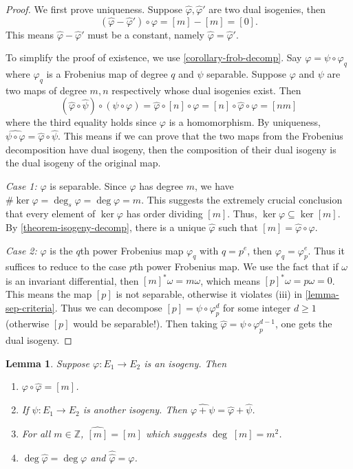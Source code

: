 \documentclass[12pt]{article}
\newtheorem{lemma}{Lemma}[subsection]
\theoremstyle{remark}
\theoremstyle{definition}
\newcommand{\w}[0]{\omega}
\newcommand{\Z}[0]{\mathbb{Z}}
\begin{document}
        \begin{proof}
            We first prove uniqueness. Suppose $\hat\varphi,\hat\varphi'$ are two dual isogenies, then \[\left(\hat\varphi-\hat\varphi'\right)\circ\varphi=[m]-[m]=[0].\] 
            This means $\hat\varphi-\hat\varphi'$ must be a constant, namely $\hat\varphi=\hat\varphi'$.
    
            To simplify the proof of existence, we use \autoref{corollary-frob-decomp}. Say $\varphi=\psi\circ\varphi_q$ where $\varphi_q$ is a Frobenius map of degree $q$ and $\psi$ separable. Suppose $\varphi$ and $\psi$ are two maps of degree $m,n$ respectively whose dual isogenies exist. Then 
            \[(\hat{\varphi}\circ\hat\psi)\circ(\psi\circ\varphi)=\hat\varphi\circ[n]\circ\varphi=[n]\circ\hat\varphi\circ\varphi=[nm]\]
            where the third equality holds since $\varphi$ is a homomorphism. By uniqueness, $\widehat{\psi\circ\varphi}=\hat{\varphi}\circ\hat\psi$. This means if we can prove that the two maps from the Frobenius decomposition have dual isogeny, then the composition of their dual isogeny is the dual isogeny of the original map.
            
            \textit{Case 1: }$\varphi$ is separable. Since $\varphi$ has degree $m$, we have $\#\ker\varphi=\deg_s\varphi=\deg\varphi=m$. This suggests the extremely crucial conclusion that every element of $\ker\varphi$ has order dividing $[m]$. Thus, $\ker\varphi\subseteq \ker[m]$. By \autoref{theorem-isogeny-decomp}, there is a unique $\hat\varphi$ such that $[m]=\hat\varphi\circ\varphi$.
            
            \textit{Case 2: }$\varphi$ is the $q$th power Frobenius map $\varphi_q$ with $q=p^e$, then $\varphi_q=\varphi_p^e$. Thus it suffices to reduce to the case $p$th power Frobenius map. We use the fact that if $\w$ is an invariant differential, then $[m]^*\w=m\w$, which means $[p]^*\w=p\w=0$. This means the map $[p]$ is not separable, otherwise it violates (iii) in \autoref{lemma-sep-criteria}. Thus we can decompose $[p]=\psi\circ\varphi_p^d$ for some integer $d\geqslant 1$ (otherwise $[p]$ would be separable!). Then taking $\hat\varphi=\psi\circ\varphi_p^{d-1}$, one gets the dual isogeny.
        \end{proof}
        \begin{lemma}\label{lemma-dual-prop}
            Suppose $\varphi:E_1\to E_2$ is an isogeny. Then
            \begin{enumerate}[\normalfont(i)]
                \item $\varphi\circ\hat\varphi=[m]$.
                \item If $\psi:E_1\to E_2$ is another isogeny. Then $\widehat{\varphi+\psi}=\hat\varphi+\hat\psi$.
                \item For all $m\in\Z$, $\widehat{[m]}=[m]$ which suggests $\deg\; [m]=m^2$.
                \item $\deg\hat\varphi=\deg\varphi$ and $\hat{\hat\varphi}=\varphi$.
            \end{enumerate}
        \end{lemma}
\end{document}
